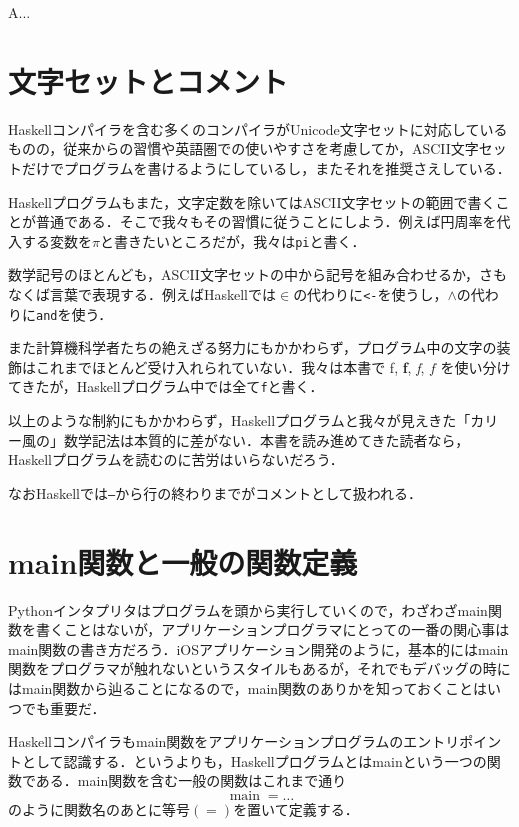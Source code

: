 \documentclass[a4paper]{jsbook}
\newcommand{\programminglanguage}[1]{\textsf{#1}}
\newcommand{\haskell}{\programminglanguage{Haskell}}
\newcommand{\python}{\programminglanguage{Python}}
\newenvironment{leader}{\begingroup}{\endgroup}
\newcommand{\code}[1]{\texttt{#1}}
\DeclareMathOperator{\mathMain}{main}
\begin{document}
\begin{leader}
A...
\end{leader}


\section{文字セットとコメント}

\haskell コンパイラを含む多くのコンパイラがUnicode文字セットに対応しているものの，従来からの習慣や英語圏での使いやすさを考慮してか，ASCII文字セットだけでプログラムを書けるようにしているし，またそれを推奨さえしている．

\haskell プログラムもまた，文字定数を除いてはASCII文字セットの範囲で書くことが普通である．そこで我々もその習慣に従うことにしよう．例えば円周率を代入する変数を$\pi$と書きたいところだが，我々は\code{pi}と書く．

数学記号のほとんども，ASCII文字セットの中から記号を組み合わせるか，さもなくば言葉で表現する．例えば\haskell では$\in$の代わりに\code{<-}を使うし，$\wedge$の代わりに\code{and}を使う．

また計算機科学者たちの絶えざる努力にもかかわらず，プログラム中の文字の装飾はこれまでほとんど受け入れられていない．我々は本書で \textrm{f}, \textbf{f}, \textit{f}, $f$ を使い分けてきたが，\haskell プログラム中では全て\code{f}と書く．

以上のような制約にもかかわらず，\haskell プログラムと我々が見えきた「カリー風の」数学記法は本質的に差がない．本書を読み進めてきた読者なら，\haskell プログラムを読むのに苦労はいらないだろう．

なお\haskell では\code{--}から行の終わりまでがコメントとして扱われる．

\section{main関数と一般の関数定義}

\python インタプリタはプログラムを頭から実行していくので，わざわざmain関数を書くことはないが，アプリケーションプログラマにとっての一番の関心事はmain関数の書き方だろう．iOSアプリケーション開発のように，基本的にはmain関数をプログラマが触れないというスタイルもあるが，それでもデバッグの時にはmain関数から辿ることになるので，main関数のありかを知っておくことはいつでも重要だ．

\haskell コンパイラもmain関数をアプリケーションプログラムのエントリポイントとして認識する．というよりも，\haskell プログラムとはmainという一つの関数である．main関数を含む一般の関数はこれまで通り
\begin{equation}
\mathMain=\dots
\end{equation}
のように関数名のあとに等号$(=)$を置いて定義する．
\end{document}
